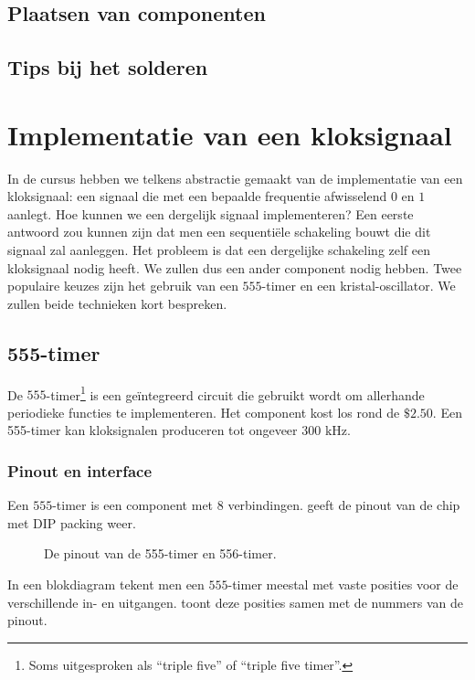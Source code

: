 \subsection{Plaatsen van componenten}
\subsection{Tips bij het solderen}
\section{Implementatie van een kloksignaal}
In de cursus hebben we telkens abstractie gemaakt van de implementatie van een kloksignaal: een signaal die met een bepaalde frequentie afwisselend $0$ en $1$ aanlegt. Hoe kunnen we een dergelijk signaal implementeren? Een eerste antwoord zou kunnen zijn dat men een sequenti\"ele schakeling bouwt die dit signaal zal aanleggen. Het probleem is dat een dergelijke schakeling zelf een kloksignaal nodig heeft. We zullen dus een ander component nodig hebben. Twee populaire keuzes zijn het gebruik van een $555$-timer en een kristal-oscillator. We zullen beide technieken kort bespreken.
\subsection{555-timer}
De $555$-timer\footnote{Soms uitgesproken als ``triple five'' of ``triple five timer''.} is een ge\"integreerd circuit die gebruikt wordt om allerhande periodieke functies te implementeren. Het component kost los rond de $\$ 2.50$. Een 555-timer kan kloksignalen produceren tot ongeveer $300\mbox{ kHz}$.
\subsubsection{Pinout en interface}
Een $555$-timer is een component met $8$ verbindingen.  geeft de pinout van de chip met DIP packing weer.
\begin{figure}[hbt]
\centering
{}
\caption{De pinout van de 555-timer en 556-timer.}
\end{figure}
In een blokdiagram tekent men een $555$-timer meestal met vaste posities voor de verschillende in- en uitgangen.  toont deze posities samen met de nummers van de pinout.
